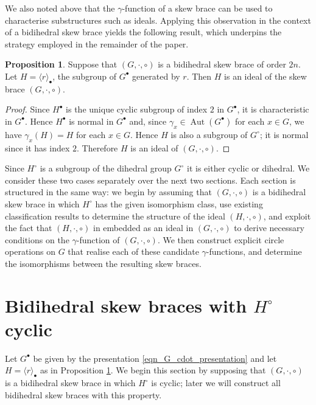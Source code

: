 \documentclass[reqno]{amsart}
\theoremstyle{definition}
\newtheorem{proposition}[theorem]{Proposition}
\DeclareMathOperator{\Aut}{\mbox{Aut}}
\begin{document}
We also noted above that the $ \gamma $-function of a skew brace can be used to characterise substructures such as ideals. Applying this observation in the context of a bidihedral skew brace yields the following result, which underpins the strategy employed in the remainder of the paper. 

\begin{proposition} \label{prop_H}
Suppose that $ (G,\cdot,\circ) $ is a bidihedral skew brace of order $ 2n $. 
Let $ H = \langle r \rangle_{\bullet} $, the subgroup of $ G^{\bullet} $ generated by $ r $. Then $ H $ is an ideal of the skew brace $ (G,\cdot,\circ) $. 
\end{proposition}
\begin{proof}
Since $ H^{\bullet} $ is the unique cyclic subgroup of index $ 2 $ in $ G^{\bullet} $, it is characteristic in $ G^{\bullet} $. Hence $ H^{\bullet} $ is normal in $ G^{\bullet} $ and, since $ \gamma_{x} \in \Aut(G^{\bullet}) $ for each $ x \in G $, we have $ \gamma_{x}(H)=H $ for each $ x \in G $. Hence $ H $ is also a subgroup of $ G^{\circ} $; it is normal since it has index $ 2 $. Therefore $ H $ is an ideal of $ (G,\cdot,\circ) $. 
\end{proof}

Since $ H^{\circ} $ is a subgroup of the dihedral group $ G^{\circ} $ it is either cyclic or dihedral. We consider these two cases separately over the next two sections. Each section is structured in the same way: we begin by assuming that $ (G,\cdot,\circ) $ is a bidihedral skew brace in which $ H^{\circ} $ has the given isomorphism class, use existing classification results to determine the structure of the ideal $ (H,\cdot,\circ) $, and exploit the fact that $ (H,\cdot,\circ) $ in embedded as an ideal in $ (G,\cdot,\circ) $ to derive necessary conditions on the $ \gamma $-function of $ (G,\cdot,\circ) $. We then construct explicit circle operations on $ G $ that realise each of these candidate $ \gamma $-functions, and determine the isomorphisms between the resulting skew braces. 

\section{Bidihedral skew braces with $ H^{\circ} $ cyclic} \label{sec_H_cyclic}

Let $ G^{\bullet} $ be given by the presentation \eqref{eqn_G_cdot_presentation}   and let $ H = \langle r \rangle_{\bullet} $ as in Proposition \ref{prop_H}.   We begin this section by supposing that $ (G,\cdot,\circ) $ is a bidihedral skew brace in which $ H^{\circ} $ is cyclic; later we will construct all bidihedral skew braces with this property. 
\end{document}
